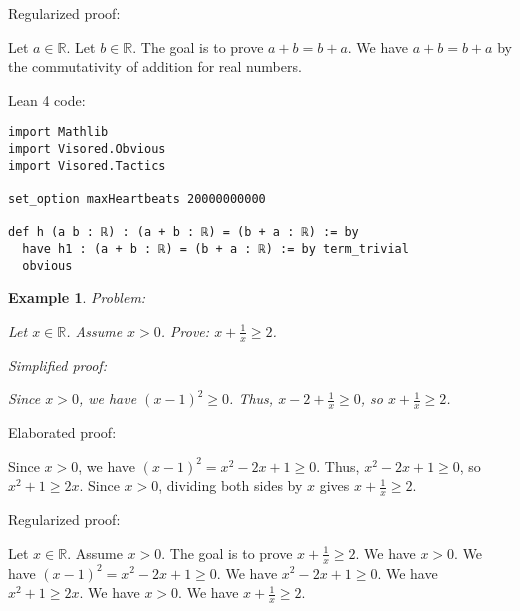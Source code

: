 \documentclass{article}
\newtheorem{example}{Example}
\begin{document}
Regularized proof:
\begin{tcolorbox}[colback=red!10, width=\linewidth]
Let $a\in\mathbb{R}$.
Let $b\in\mathbb{R}$.
The goal is to prove $a+b=b+a$.
We have $a+b=b+a$ by the commutativity of addition for real numbers.
\end{tcolorbox}

Lean 4 code:
\begin{tcolorbox}[colback=white!10, width=\linewidth]
\begin{lstlisting}[language=Lean4]
import Mathlib
import Visored.Obvious
import Visored.Tactics

set_option maxHeartbeats 20000000000

def h (a b : ℝ) : (a + b : ℝ) = (b + a : ℝ) := by
  have h1 : (a + b : ℝ) = (b + a : ℝ) := by term_trivial
  obvious

\end{lstlisting}
\end{tcolorbox}


\begin{example}
Problem:
\begin{tcolorbox}[colback=yellow!10, width=\linewidth]
Let $x\in\mathbb{R}$. Assume $x> 0$. Prove: $x + \frac{1}{x} \ge 2$.
\end{tcolorbox}

Simplified proof:
\begin{tcolorbox}[colback=blue!10, width=\linewidth]
Since $x>0$, we have $(x-1)^2 \ge 0$. Thus, $x - 2 + \frac{1}{x} \ge 0$, so $x + \frac{1}{x} \ge 2$.
\end{tcolorbox}
\end{example}

Elaborated proof:
\begin{tcolorbox}[colback=green!10, width=\linewidth]
Since $x>0$, we have $(x-1)^2 = x^2 - 2x + 1 \ge 0$. Thus, $x^2 - 2x + 1 \ge 0$, so $x^2 + 1 \ge 2x$. Since $x > 0$, dividing both sides by $x$ gives $x + \frac{1}{x} \ge 2$.
\end{tcolorbox}

Regularized proof:
\begin{tcolorbox}[colback=red!10, width=\linewidth]
Let $x\in\mathbb{R}$.
Assume $x>0$.
The goal is to prove $x + \frac{1}{x} \ge 2$.
We have $x>0$.
We have ${{(x-1)}}^2 = x^2 - 2x + 1 \ge 0$.
We have $x^2 - 2x + 1 \ge 0$.
We have $x^2 + 1 \ge 2x$.
We have $x > 0$.
We have $x + \frac{1}{x} \ge 2$.
\end{tcolorbox}
\end{document}

